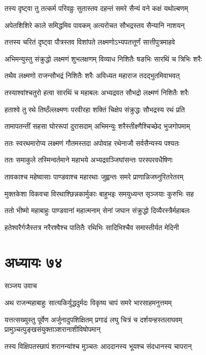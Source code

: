 \twolineshloka
{तस्य दृष्ट्वा तु तत्कर्म परिवव्रुः सुतास्तव}
{दहन्तं समरे सैन्यं वने कक्षं यथोल्बणम्}


\twolineshloka
{अपेतशिशिरे काले समिद्धमिव पावकम्}
{अत्यरोचत सौभद्रस्तव सैन्यानि नाशयन्}


\twolineshloka
{तत्तस्य चरितं दृष्ट्वा पौत्रस्तव विशांपते}
{लक्ष्मणोऽभ्यपतत्तूर्णं सात्तीपुत्रमाहवे}


\twolineshloka
{अभिमन्युस्तु संक्रुद्धो लक्ष्मणं शुभलक्षणम्}
{विव्याध निशितैः षङभिः सारथिं च त्रिभिः शरैः}


\twolineshloka
{तथैव लक्ष्मणो राजन्सौभद्रं निशितैः शरैः}
{अविध्यत महाराज तदद्भुतमिवाभवत्}


\twolineshloka
{तस्याश्वांश्चतुरो हत्वा सारथिं च महाबलः}
{अभ्यद्रवत सौभद्रो लक्ष्मणं निशितैः शरैः}


\twolineshloka
{हताश्वे तु रथे तिष्ठँल्लक्ष्मणः परवीरहा}
{शक्तिं चिक्षेप संक्रुद्धः सौभद्रस्य रथं प्रति}


\twolineshloka
{तामापतन्तीं सहसा घोररूपां दुरासदाम्}
{अभिमन्युः शरैस्तीक्ष्णैश्चिच्छेद भुजगोपमाम्}


\twolineshloka
{ततः स्वरथमारोप्य लक्ष्मणं गौतमस्तदा}
{अपोवाह रथेनाजौ सर्वसैन्यस्य पश्यतः}


\twolineshloka
{ततः समाकुले तस्मिन्वर्तमाने महाभये}
{अभ्यद्रवञ्जिघांसन्तः परस्परवधैषिणः}


\twolineshloka
{तावकाश्च महेष्वासाः पाण्डवाश्च महारथाः}
{जुह्वन्तः समरे प्राणान्निजघ्नुरितरेतरम्}


\twolineshloka
{मुक्तकेशा विकवचा विरथाश्छिन्नकार्मुकाः}
{बाहुभइः समयुध्यन्त सृञ्जयाः कुरुभिः सह}


\twolineshloka
{ततो भीष्मो महाबाहुः पाण्डवानां महात्मनाम्}
{सेनां जघान संक्रुद्धो दिव्यैरस्त्रैर्महाबलः}


\twolineshloka
{हतेश्वरैर्गजैस्तत्र नरैरश्वैश्च पातितैः}
{रथिभिः सादिभिश्चैव समास्तीर्यत मेदिनी}


\chapter{अध्यायः ७४}
\twolineshloka
{सञ्जय उवाच}
{}


\twolineshloka
{अथ राजन्महाबाहुः सात्यकिर्युद्धदुर्मदः}
{विकृष्य चापं समरे भारसाहमनुत्तमम्}


\threelineshloka
{यत्तत्सख्युस्तु पूर्वेण अर्जुनादुपशिक्षितम्}
{प्रगाढं लघु चित्रं च दर्शयन्हस्तलाघवम्}
{प्रामुञ्चत्पुङ्खसंयुक्ताञ्शरानाशीविषोपमान्}


\twolineshloka
{तस्य विक्षिपतस्छापं शरानन्यांश्च मुञ्चतः}
{आददानस्य भूयश्च संदधानस्य चापरान्}


